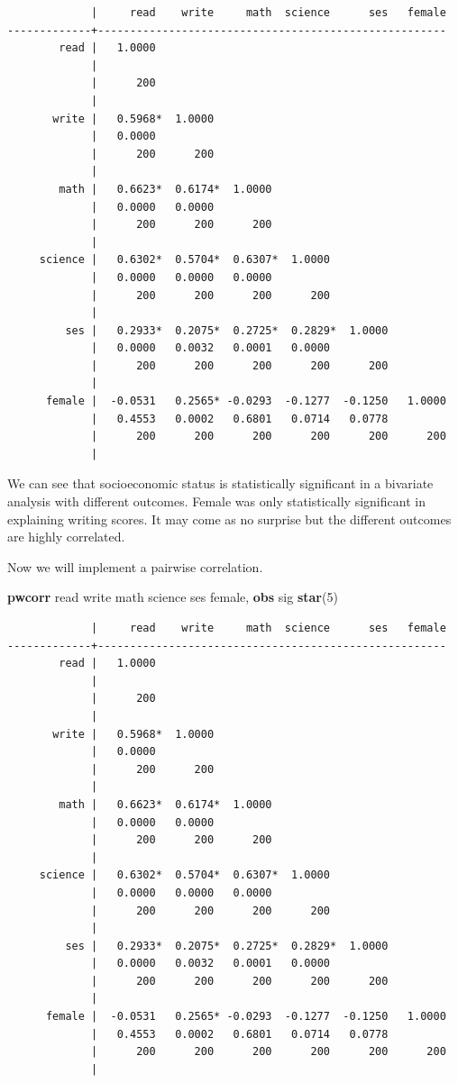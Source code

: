 \documentclass[
]{book}
\newenvironment{Shaded}{\begin{snugshade}}{\end{snugshade}}
\newcommand{\KeywordTok}[1]{\textcolor[rgb]{0.13,0.29,0.53}{\textbf{#1}}}
\newcommand{\NormalTok}[1]{#1}
\begin{document}
\begin{verbatim}
             |     read    write     math  science      ses   female
-------------+------------------------------------------------------
        read |   1.0000 
             |
             |      200
             |
       write |   0.5968*  1.0000 
             |   0.0000
             |      200      200
             |
        math |   0.6623*  0.6174*  1.0000 
             |   0.0000   0.0000
             |      200      200      200
             |
     science |   0.6302*  0.5704*  0.6307*  1.0000 
             |   0.0000   0.0000   0.0000
             |      200      200      200      200
             |
         ses |   0.2933*  0.2075*  0.2725*  0.2829*  1.0000 
             |   0.0000   0.0032   0.0001   0.0000
             |      200      200      200      200      200
             |
      female |  -0.0531   0.2565* -0.0293  -0.1277  -0.1250   1.0000 
             |   0.4553   0.0002   0.6801   0.0714   0.0778
             |      200      200      200      200      200      200
             |
\end{verbatim}

We can see that socioeconomic status is statistically significant in a bivariate analysis with different outcomes. Female was only statistically significant in explaining writing scores. It may come as no surprise but the different outcomes are highly correlated.

Now we will implement a pairwise correlation.

\begin{Shaded}
\begin{Highlighting}[]
\KeywordTok{pwcorr}\NormalTok{ read write math science ses female, }\KeywordTok{obs}\NormalTok{ sig }\KeywordTok{star}\NormalTok{(5)}
\end{Highlighting}
\end{Shaded}

\begin{verbatim}
             |     read    write     math  science      ses   female
-------------+------------------------------------------------------
        read |   1.0000 
             |
             |      200
             |
       write |   0.5968*  1.0000 
             |   0.0000
             |      200      200
             |
        math |   0.6623*  0.6174*  1.0000 
             |   0.0000   0.0000
             |      200      200      200
             |
     science |   0.6302*  0.5704*  0.6307*  1.0000 
             |   0.0000   0.0000   0.0000
             |      200      200      200      200
             |
         ses |   0.2933*  0.2075*  0.2725*  0.2829*  1.0000 
             |   0.0000   0.0032   0.0001   0.0000
             |      200      200      200      200      200
             |
      female |  -0.0531   0.2565* -0.0293  -0.1277  -0.1250   1.0000 
             |   0.4553   0.0002   0.6801   0.0714   0.0778
             |      200      200      200      200      200      200
             |
\end{verbatim}
\end{document}
